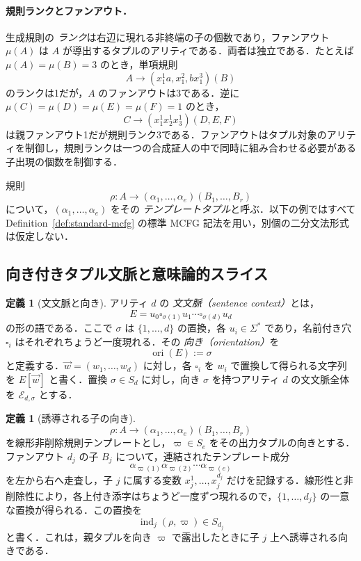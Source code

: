 \documentclass[11pt,a4paper]{ltjsarticle}
\numberwithin{equation}{section}
\theoremstyle{plain}
\theoremstyle{definition}
\newtheorem{definition}[theorem]{定義}
\theoremstyle{remark}
\newcommand{\tuple}[1]{\vec{#1}}
\newcommand{\blank}{\square}
\begin{document}
\paragraph{規則ランクとファンアウト．}
生成規則の \emph{ランク}は右辺に現れる非終端の子の個数であり，ファンアウト $\mu(A)$ は $A$ が導出するタプルのアリティである．両者は独立である．たとえば $\mu(A)=\mu(B)=3$ のとき，単項規則
\[
A\to(x_1^1a,x_1^2,bx_1^3)(B)
\]
のランクは1だが，$A$ のファンアウトは3である．逆に $\mu(C)=\mu(D)=\mu(E)=\mu(F)=1$ のとき，
\[
C\to(x_1^1x_2^1x_3^1)(D,E,F)
\]
は親ファンアウト1だが規則ランク3である．ファンアウトはタプル対象のアリティを制御し，規則ランクは一つの合成証人の中で同時に組み合わせる必要がある子出現の個数を制御する．

規則
\[
\rho:A\to(\alpha_1,\ldots,\alpha_e)(B_1,\ldots,B_r)
\]
について，$(\alpha_1,\ldots,\alpha_e)$ をその \emph{テンプレートタプル}と呼ぶ．以下の例ではすべて Definition~\ref{def:standard-mcfg} の標準 MCFG 記法を用い，別個の二分文法形式は仮定しない．

\subsection{向き付きタプル文脈と意味論的スライス}

\begin{definition}[文文脈と向き]
\label{def:sentence-context}
アリティ $d$ の \emph{文文脈（sentence context）}とは，
\[
  E=u_0\blank_{\sigma(1)}u_1\cdots\blank_{\sigma(d)}u_d
\]
の形の語である．ここで $\sigma$ は $\{1,\ldots,d\}$ の置換，各 $u_i\in\Sigma^*$ であり，名前付き穴 $\blank_i$ はそれぞれちょうど一度現れる．その \emph{向き（orientation）}を
\[
\operatorname{ori}(E):=\sigma
\]
と定義する．$\tuple w=(w_1,\ldots,w_d)$ に対し，各 $\blank_i$ を $w_i$ で置換して得られる文字列を $E[\tuple w]$ と書く．置換 $\sigma\in S_d$ に対し，向き $\sigma$ を持つアリティ $d$ の文文脈全体を $\mathcal E_{d,\sigma}$ とする．
\end{definition}

\begin{definition}[誘導される子の向き]
\label{def:induced-orientation}
\[
\rho:A\to(\alpha_1,\ldots,\alpha_e)(B_1,\ldots,B_r)
\]
を線形非削除規則テンプレートとし，$\varpi\in S_e$ をその出力タプルの向きとする．ファンアウト $d_j$ の子 $B_j$ について，連結されたテンプレート成分
\[
  \alpha_{\varpi(1)}\alpha_{\varpi(2)}\cdots\alpha_{\varpi(e)}
\]
を左から右へ走査し，子 $j$ に属する変数 $x_j^1,\ldots,x_j^{d_j}$ だけを記録する．線形性と非削除性により，各上付き添字はちょうど一度ずつ現れるので，$\{1,\ldots,d_j\}$ の一意な置換が得られる．この置換を
\[
  \operatorname{ind}_j(\rho,\varpi)\in S_{d_j}
\]
と書く．これは，親タプルを向き $\varpi$ で露出したときに子 $j$ 上へ誘導される向きである．
\end{definition}
\end{document}
